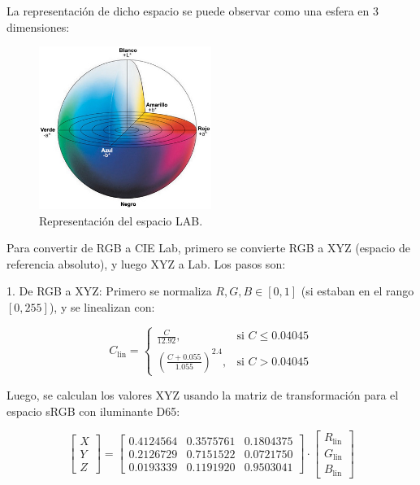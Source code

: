 \documentclass[11pt, letterpaper]{article}
\begin{document}
La representación de dicho espacio se puede observar como una esfera en 3 dimensiones:

\begin{figure}[h!]
	\centering
	\includegraphics[width=0.5\textwidth]{IMG/REF2.jpg}
	\caption{Representación del espacio LAB.}
	\label{fig:r2}
\end{figure}


Para convertir de RGB a CIE L\*a\*b\*, primero se convierte RGB a XYZ (espacio de referencia absoluto), y luego XYZ a L\*a\*b\*. Los pasos son:

1. De RGB a XYZ: 
Primero se normaliza \( R, G, B \in [0,1] \) (si estaban en el rango \([0,255]\)), y se linealizan con:

\[
C_{\text{lin}} =
\begin{cases}
	\frac{C}{12.92}, & \text{si } C \leq 0.04045 \\
	\left( \frac{C + 0.055}{1.055} \right)^{2.4}, & \text{si } C > 0.04045
\end{cases}
\]

Luego, se calculan los valores XYZ usando la matriz de transformación para el espacio sRGB con iluminante D65:

\[
\begin{bmatrix}
	X \\
	Y \\
	Z
\end{bmatrix}
=
\begin{bmatrix}
	0.4124564 & 0.3575761 & 0.1804375 \\
	0.2126729 & 0.7151522 & 0.0721750 \\
	0.0193339 & 0.1191920 & 0.9503041
\end{bmatrix}
\cdot
\begin{bmatrix}
	R_{\text{lin}} \\
	G_{\text{lin}} \\
	B_{\text{lin}}
\end{bmatrix}
\]
\end{document}
